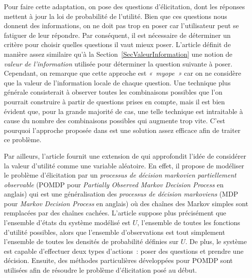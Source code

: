 \documentclass[a4paper,11pt]{article}
\theoremstyle{plain}
\theoremstyle{definition}
\begin{document}
Pour faire cette adaptation, on pose des questions d'élicitation, dont les réponses mettent à jour la loi de probabilité de l'utilité. Bien que ces questions nous donnent des informations, on ne doit pas trop en poser car l'utilisateur peut se fatiguer de leur répondre. Par conséquent, il est nécessaire de déterminer un critère pour choisir quelles questions il vaut mieux poser. L'article \cite{chajewska_making_2000} définit de manière assez similaire qu'à la Section~\ref{SecValeurInformation} une notion de \emph{valeur de l'information} utilisée pour déterminer la question suivante à poser. Cependant, on remarque que cette approche est \emph{«~myope~»} car on ne considère que la valeur de l'information locale de chaque question. Une technique plus générale consisterait à observer toutes les combinaisons possibles que l'on pourrait construire à partir de questions prises en compte, mais il est bien évident que, pour la grande majorité de cas, une telle technique est intraitable à cause du nombre des combinaisons possibles qui augmente trop vite. C'est pourquoi l'approche proposée dans \cite{chajewska_making_2000} est une solution assez efficace afin de traiter ce problème.

Par ailleurs, l'article \cite{boutilier_pomdp_2002} fournit une extension de \cite{chajewska_making_2000} qui approfondit l'idée de considérer la valeur d'utilité comme une variable aléatoire. En effet, il propose de modéliser le problème d'élicitation par un \emph{processus de décision markovien partiellement observable} (POMDP pour \emph{Partially Observed Markov Decision Process} en anglais) qui est une généralisation des \emph{processus de décision markoviens} (MDP pour \emph{Markov Decision Process} en anglais) où des chaînes des Markov simples sont remplacées par des chaînes cachées. L'article \cite{boutilier_pomdp_2002} suppose plus précisément que l'ensemble d'états du système modélisé est $U$, l'ensemble de toutes les fonctions d'utilité possibles, alors que l'ensemble d'observations est tout simplement l'ensemble de toutes les densités de probabilité définies sur $U$. De plus, le système est capable d'effectuer deux types d'actions~: poser des questions et prendre une décision. Ensuite, des méthodes particulières développées pour POMDP sont utilisées afin de résoudre le problème d'élicitation posé au début. %
\end{document}
